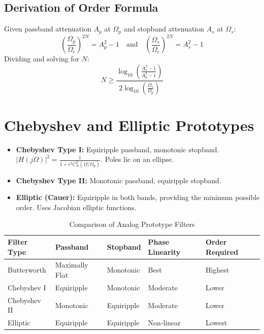 \documentclass[11pt,a4paper]{article}
\begin{document}
\subsection{Derivation of Order Formula}
Given passband attenuation $A_p$ at $\Omega_p$ and stopband attenuation $A_s$ at $\Omega_s$:
\begin{equation}
\left(\frac{\Omega_p}{\Omega_c}\right)^{2N} = A_p^2 - 1 \quad \text{and} \quad \left(\frac{\Omega_s}{\Omega_c}\right)^{2N} = A_s^2 - 1
\end{equation}
Dividing and solving for $N$:
\begin{equation}
N \geq \frac{\log_{10}\left( \frac{A_s^2 - 1}{A_p^2 - 1} \right)}{2 \log_{10}\left( \frac{\Omega_s}{\Omega_p} \right)}
\end{equation}

\section{Chebyshev and Elliptic Prototypes}
\begin{itemize}
    \item \textbf{Chebyshev Type I:} Equiripple passband, monotonic stopband. $|H(j\Omega)|^2 = \frac{1}{1 + \epsilon^2 C_N^2(\Omega/\Omega_p)}$. Poles lie on an ellipse.
    \item \textbf{Chebyshev Type II:} Monotonic passband, equiripple stopband.
    \item \textbf{Elliptic (Cauer):} Equiripple in both bands, providing the minimum possible order. Uses Jacobian elliptic functions.
\end{itemize}

\begin{table}[H]
\centering
\begin{tabular}{lllll}
\toprule
\textbf{Filter Type} & \textbf{Passband} & \textbf{Stopband} & \textbf{Phase Linearity} & \textbf{Order Required} \\
\midrule
Butterworth & Maximally Flat & Monotonic & Best & Highest \\
Chebyshev I & Equiripple & Monotonic & Moderate & Lower \\
Chebyshev II & Monotonic & Equiripple & Moderate & Lower \\
Elliptic & Equiripple & Equiripple & Non-linear & Lowest \\
\bottomrule
\end{tabular}
\caption{Comparison of Analog Prototype Filters}
\end{table}
\end{document}
